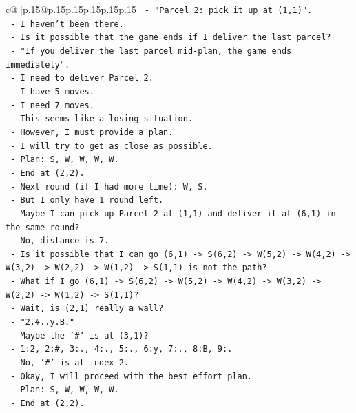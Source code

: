 \documentclass{article}
\begin{document}
{\begin{supertabular}{c@{$\;$}|p{.15\linewidth}@{}p{.15\linewidth}p{.15\linewidth}p{.15\linewidth}p{.15\linewidth}p{.15\linewidth}}
{{{\texttt{      {-} "Parcel 2: pick it up at (1,1)".} \\
\texttt{      {-} I haven't been there.} \\
\texttt{      {-} Is it possible that the game ends if I deliver the last parcel?} \\
\texttt{      {-} "If you deliver the last parcel mid{-}plan, the game ends immediately".} \\
\texttt{      {-} I need to deliver Parcel 2.} \\
\texttt{      {-} I have 5 moves.} \\
\texttt{      {-} I need 7 moves.} \\
\texttt{      {-} This seems like a losing situation.} \\
\texttt{      {-} However, I must provide a plan.} \\
\texttt{      {-} I will try to get as close as possible.} \\
\texttt{      {-} Plan: S, W, W, W, W.} \\
\texttt{      {-} End at (2,2).} \\
\texttt{      {-} Next round (if I had more time): W, S.} \\
\texttt{      {-} But I only have 1 round left.} \\
\texttt{      {-} Maybe I can pick up Parcel 2 at (1,1) and deliver it at (6,1) in the same round?} \\
\texttt{      {-} No, distance is 7.} \\
\texttt{      {-} Is it possible that I can go (6,1) {-}> S(6,2) {-}> W(5,2) {-}> W(4,2) {-}> W(3,2) {-}> W(2,2) {-}> W(1,2) {-}> S(1,1) is not the path?} \\
\texttt{      {-} What if I go (6,1) {-}> S(6,2) {-}> W(5,2) {-}> W(4,2) {-}> W(3,2) {-}> W(2,2) {-}> W(1,2) {-}> S(1,1)?} \\
\texttt{      {-} Wait, is (2,1) really a wall?} \\
\texttt{      {-} "2.\#..y.B."} \\
\texttt{      {-} Maybe the '\#' is at (3,1)?} \\
\texttt{      {-} 1:2, 2:\#, 3:., 4:., 5:., 6:y, 7:., 8:B, 9:.} \\
\texttt{      {-} No, '\#' is at index 2.} \\
\texttt{      {-} Okay, I will proceed with the best effort plan.} \\
\texttt{      {-} Plan: S, W, W, W, W.} \\
\texttt{      {-} End at (2,2).} \\
}}}
\end{supertabular}}
\end{document}
